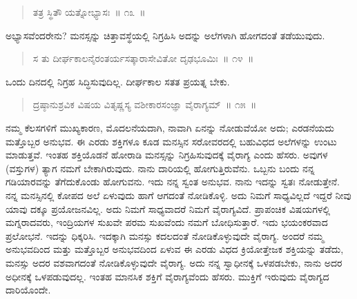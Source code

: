 \vspace{-0.2cm}

\begin{verse}
ತತ್ರ ಸ್ಥಿತೌ ಯತ್ನೋಭ್ಯಾಸಃ~॥ ೧೩~॥
\end{verse}

\vspace{-0.2cm}


ಅಭ್ಯಾಸವೆಂದರೇನು? ಮನಸ್ಸನ್ನು ಚಿತ್ತಾವಸ್ಥೆಯಲ್ಲಿ ನಿಗ್ರಹಿಸಿ ಅದನ್ನು ಅಲೆಗಳಾಗಿ ಹೋಗದಂತೆ ತಡೆಯುವುದು. 

\vspace{-0.2cm}

\begin{verse}
ಸ ತು ದೀರ್ಘಕಾಲನೈರಂತರ್ಯಸತ್ಕಾರಾಸೇವಿತೋ ದೃಢಭೂಮಿಃ~॥ ೧೪~॥
\end{verse}

\vspace{-0.2cm}


ಒಂದು ದಿನದಲ್ಲಿ ನಿಗ್ರಹ ಸಿದ್ಧಿಸುವುದಿಲ್ಲ. ದೀರ್ಘಕಾಲ ಸತತ ಪ್ರಯತ್ನ ಬೇಕು. 

\vspace{-0.2cm}

\begin{verse}
ದ್ರಷ್ಠಾನುಶ್ರವಿಕ ವಿಷಯ ವಿತೃಷ್ಣಸ್ಯ ವಶೀಕಾರಸಂಜ್ಞಾ ವೈರಾಗ್ಯಮ್​~॥ ೧೫~॥
\end{verse}

\vspace{-0.2cm}


ನಮ್ಮ ಕೆಲಸಗಳಿಗೆ ಮುಖ್ಯಕಾರಣ, ಮೊದಲನೆಯದಾಗಿ, ನಾವಾಗಿ ಏನನ್ನು ನೋಡು\break ವೆಯೋ ಅದು; ಎರಡನೆಯದು ಮತ್ತೊಬ್ಬರ ಅನುಭವ. ಈ ಎರಡು ಶಕ್ತಿಗಳೂ ಕೂಡ ಮನಸ್ಸಿನ ಸರೋವರದಲ್ಲಿ ಬಹುವಿಧದ ಅಲೆಗಳನ್ನು ಉಂಟು ಮಾಡುತ್ತವೆ. ಇಂತಹ ಶಕ್ತಿಯೊಡನೆ ಹೋರಾಡಿ ಮನಸ್ಸನ್ನು ನಿಗ್ರಹಿಸುವುದಕ್ಕೆ ವೈರಾಗ್ಯ ಎಂದು ಹೆಸರು. ಅವುಗಳ (ವಸ್ತುಗಳ) ತ್ಯಾಗ ನಮಗೆ ಬೇಕಾಗಿರುವುದು. ನಾನು ದಾರಿಯಲ್ಲಿ ಹೋಗುತ್ತಿರುವೆನು. ಒಬ್ಬನು ಬಂದು ನನ್ನ ಗಡಿಯಾರವನ್ನು ತೆಗೆದುಕೊಂಡು ಹೋಗುವನು. ಇದು ನನ್ನ ಸ್ವಂತ ಅನುಭವ. ನಾನು ಇದನ್ನು ಸ್ವತಃ ನೋಡುತ್ತೇನೆ. ನನ್ನ ಮನಸ್ಸಿನಲ್ಲಿ ಕೋಪದ ಅಲೆ ಏಳುವುದು ಹಾಗೆ ಆಗದಂತೆ ನೋಡಿಕೊಳ್ಳಿ. ಅದು ನಿಮಗೆ ಸಾಧ್ಯವಿಲ್ಲದೆ ಇದ್ದರೆ ನೀವು ಯಾವು ದಕ್ಕೂ ಪ್ರಯೋಜನವಿಲ್ಲ. ಅದು ನಿಮಗೆ ಸಾಧ್ಯವಾದರೆ ನಿಮಗೆ ವೈರಾಗ್ಯವಿದೆ. ಪ್ರಾಪಂಚಿಕ ವಿಷಯಗಳಲ್ಲಿ ಮಗ್ನರಾದವರು, ಇಂದ್ರಿಯಗಳ ಸುಖವೇ ಪರಮ ಸುಖವೆಂದು ನಮಗೆ ಬೋಧಿಸುತ್ತಾರೆ. ಇದು ಭಯಂಕರವಾದ ಪ್ರಲೋಭನೆ. ಇದನ್ನು ಧಿಕ್ಕರಿಸಿ. ಇದಕ್ಕಾಗಿ ಮನಸ್ಸು ಕದಲದಂತೆ ನೋಡಿಕೊಳ್ಳುವುದೇ ವೈರಾಗ್ಯ. ಅಂದರೆ ನಮ್ಮ ಅನುಭವದಿಂದ ಮತ್ತು ಮತ್ತೊಬ್ಬರ ಅನುಭವದಿಂದ ಏಳುವ ಈ ಎರಡು ವಿಧದ ಕ್ರಿಯೋತ್ತೇಜಕ ಶಕ್ತಿಯನ್ನು ತಡೆದು, ಮನಸ್ಸು ಅದರ ವಶವಾಗದಂತೆ ನೋಡಿಕೊಳ್ಳುವುದೇ ವೈರಾಗ್ಯ. ಅದು ನನ್ನ ಸ್ವಾಧೀನಕ್ಕೆ ಒಳಪಡಬೇಕು, ನಾನು ಅದರ ಅಧೀನಕ್ಕೆ ಒಳಪಡುವುದಲ್ಲ. ಇಂತಹ ಮಾನಸಿಕ ಶಕ್ತಿಗೆ ವೈರಾಗ್ಯವೆಂದು ಹೆಸರು. ಮುಕ್ತಿಗೆ ಇರುವುದು ವೈರಾಗ್ಯದ ದಾರಿಯೊಂದೇ. 

